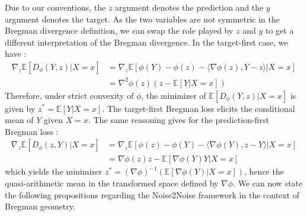 Due to our conventions, the $z$ argument denotes the prediction and the $y$ argument denotes the target.
As the two variables are not symmetric in the Bregman divergence definition, we can swap the role played by $z$ and $y$ to get a different interpretation of the Bregman divergence.
In the target-first case, we have :
\begin{align*}
    \nabla_z \mathbb{E}[D_\phi(Y, z) | X=x] &= \nabla_z \mathbb{E}[\phi(Y) - \phi(z) - \langle \nabla \phi(z), Y - z \rangle | X=x] \\
    &= \nabla^2 \phi(z) \left( z - \mathbb{E}[Y | X=x] \right)
\end{align*}
Therefore, under strict convexity of $\phi$, the minimizer of $\mathbb{E}[D_\phi(Y, z) | X=x]$ is given by $z^* = \mathbb{E}[Y | X=x]$.
The target-first Bregman loss elicits the conditional mean of $Y$ given $X=x$. The same reasoning gives for the prediction-first Bregman loss :
\begin{align*}
    \nabla_z \mathbb{E}[D_\phi(z, Y) | X=x] &= \nabla_z \mathbb{E}[\phi(z) - \phi(Y) - \langle \nabla \phi(Y), z - Y \rangle | X=x] \\
    &= \nabla \phi(z) z - \mathbb{E}[\nabla \phi(Y) Y | X=x]
\end{align*}
which yields the minimizer $z^* = (\nabla \phi)^{-1}(\mathbb{E}[\nabla \phi(Y) | X=x])$, hence the quasi-arithmetic mean in the transformed space defined by $\nabla \phi$.
We can now state the following propositions regarding the Noise2Noise framework in the context of Bregman geometry.

